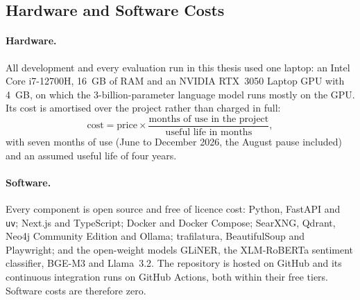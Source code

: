 
\subsection{Hardware and Software Costs}

\paragraph{Hardware.} All development and every evaluation run in this
thesis used one laptop: an Intel Core i7-12700H, 16~GB of RAM and an
NVIDIA RTX~3050 Laptop GPU with 4~GB, on which the 3-billion-parameter
language model runs mostly on the GPU. Its cost is amortised over the
project rather than charged in full:
\[
  \text{cost} = \text{price} \times
  \frac{\text{months of use in the project}}{\text{useful life in months}},
\]
with seven months of use (June to December 2026, the August pause
included) and an assumed useful life of four years.

\paragraph{Software.} Every component is open source and free of
licence cost: Python, FastAPI and \texttt{uv}; Next.js and TypeScript;
Docker and Docker Compose; SearXNG, Qdrant, Neo4j Community Edition and
Ollama; trafilatura, BeautifulSoup and Playwright; and the open-weight
models GLiNER, the XLM-RoBERTa sentiment classifier, BGE-M3 and
Llama~3.2. The repository is hosted on GitHub and its continuous
integration runs on GitHub Actions, both within their free tiers.
Software costs are therefore zero.
